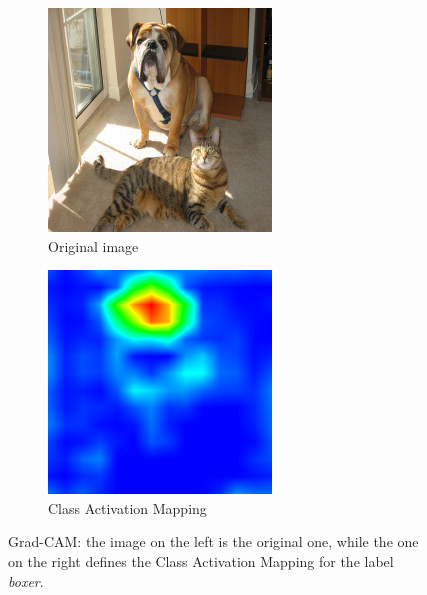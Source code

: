 \documentclass[12pt, twoside, a4paper]{report}
\begin{document}
\begin{figure}
\centering
\begin{subfigure}[b]{.49\linewidth}
\includegraphics[width=\linewidth]{images/paper-images/grad-cam-orig.png}
\caption{Original image}
\label{subfig:grad-cam-orig}
\end{subfigure}
\begin{subfigure}[b]{.49\linewidth}
\includegraphics[width=\linewidth]{images/paper-images/grad-cam-mask.png}
\caption{Class Activation Mapping}
\label{subfig:grad-cam-mask}
\end{subfigure}
\caption{Grad-CAM: the image on the left is the original one, while the one on the right defines the Class Activation Mapping for the label \textit{boxer}\protect\footnotemark.}
\label{fig:grad-cam}
\end{figure}
\end{document}
